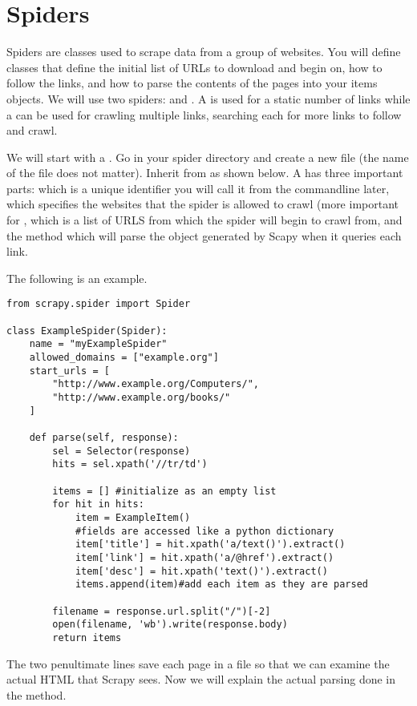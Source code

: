 \section*{Spiders}
Spiders are classes used to scrape data from a group of websites. 
You will define classes that define the initial list of URLs to download and begin on, how to follow the links, and how to parse the contents of the pages into your items objects.
We will use two spiders:  and . 
A  is used for a static number of links while a  can be used for crawling multiple links, searching each for more links to follow and crawl.

We will start with a . 
Go in your spider directory and create a new file (the name of the file does not matter). 
Inherit from  as shown below. 
A  has three important parts:  which is a unique identifier you will call it from the commandline later,  which specifies the websites that the spider is allowed to crawl (more important for ,  which is a list of URLS from which the spider will begin to crawl from, and the method  which will parse the  object generated by Scapy when it queries each link. 

The following is an example.
\begin{lstlisting}
from scrapy.spider import Spider

class ExampleSpider(Spider):
    name = "myExampleSpider"
    allowed_domains = ["example.org"]
    start_urls = [
        "http://www.example.org/Computers/",
        "http://www.example.org/books/"
    ]

    def parse(self, response):
        sel = Selector(response)
        hits = sel.xpath('//tr/td')

        items = [] #initialize as an empty list
        for hit in hits:
            item = ExampleItem()
			#fields are accessed like a python dictionary
            item['title'] = hit.xpath('a/text()').extract()
            item['link'] = hit.xpath('a/@href').extract()
            item['desc'] = hit.xpath('text()').extract()
            items.append(item)#add each item as they are parsed

		filename = response.url.split("/")[-2]
        open(filename, 'wb').write(response.body)
        return items

\end{lstlisting}
The two penultimate lines save each page in a file so that we can examine the actual HTML that Scrapy sees.
Now we will explain the actual parsing done in the  method.

